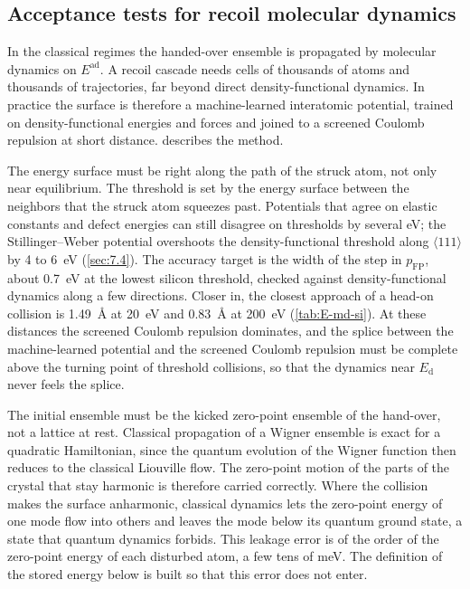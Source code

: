 \subsection{Acceptance tests for recoil molecular dynamics}\label{sec:19.1-md}

In the classical regimes the handed-over ensemble is propagated by molecular dynamics on $E^{\mathrm{ad}}$. A recoil cascade needs cells of thousands of atoms and thousands of trajectories, far beyond direct density-functional dynamics. In practice the surface is therefore a machine-learned interatomic potential, trained on density-functional energies and forces and joined to a screened Coulomb repulsion at short distance.  describes the method.

The energy surface must be right along the path of the struck atom, not only near equilibrium. The threshold is set by the energy surface between the neighbors that the struck atom squeezes past. Potentials that agree on elastic constants and defect energies can still disagree on thresholds by several eV; the Stillinger--Weber potential overshoots the density-functional threshold along $\langle111\rangle$ by 4 to \SI{6}{eV} (\cref{sec:7.4}). The accuracy target is the width of the step in $p_{\mathrm{FP}}$, about \SI{0.7}{eV} at the lowest silicon threshold, checked against density-functional dynamics along a few directions. Closer in, the closest approach of a head-on collision is \SI{1.49}{\angstrom} at \SI{20}{eV} and \SI{0.83}{\angstrom} at \SI{200}{eV} (\cref{tab:E-md-si}). At these distances the screened Coulomb repulsion dominates, and the splice between the machine-learned potential and the screened Coulomb repulsion must be complete above the turning point of threshold collisions, so that the dynamics near $E_{\mathrm{d}}$ never feels the splice.

The initial ensemble must be the kicked zero-point ensemble of the hand-over, not a lattice at rest. Classical propagation of a Wigner ensemble is exact for a quadratic Hamiltonian, since the quantum evolution of the Wigner function then reduces to the classical Liouville flow. The zero-point motion of the parts of the crystal that stay harmonic is therefore carried correctly. Where the collision makes the surface anharmonic, classical dynamics lets the zero-point energy of one mode flow into others and leaves the mode below its quantum ground state, a state that quantum dynamics forbids. This leakage error is of the order of the zero-point energy of each disturbed atom, a few tens of meV. The definition of the stored energy below is built so that this error does not enter.

